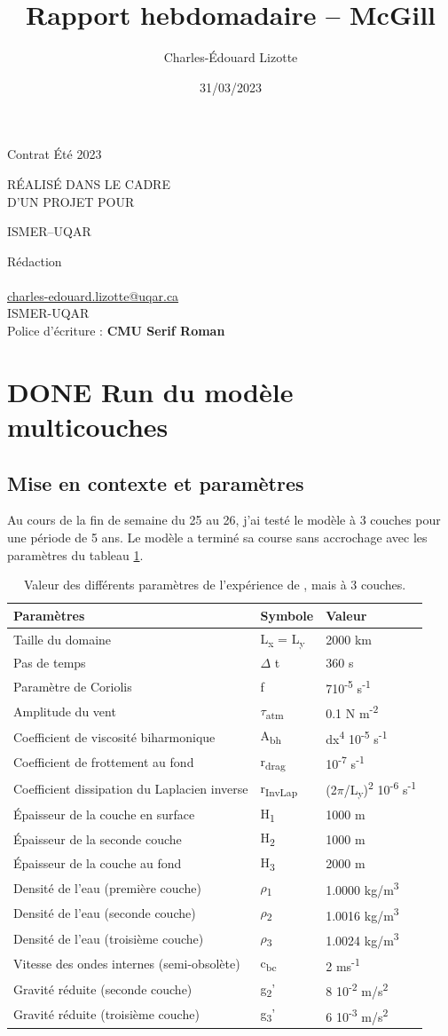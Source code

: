 \documentclass[10pt]{article}
\author{Charles-Édouard Lizotte}
\date{31/03/2023}
\title{Rapport hebdomadaire -- McGill}
\makeatletter
\numberwithin{equation}{section}
\newcommand{\mytitlepage}{
\begin{titlepage}
\begin{center}
{\Huge \thesubtitle \par}
\vspace{2cm}
{\Huge \MakeUppercase{\thetitle} \par}
\vspace{2cm}
RÉALISÉ DANS LE CADRE\\ D'UN PROJET POUR \par
\vspace{2cm}
{\Huge ISMER--UQAR \par}
\vspace{2cm}
{\thedate}
\end{center}
\vfill
Rédaction \\
{\theauthor}\\
\url{charles-edouard.lizotte@uqar.ca}\\
ISMER-UQAR\\
Police d'écriture : \textbf{CMU Serif Roman}
\end{titlepage}
}
\newcommand{\thesubtitle}{Contrat Été 2023}
\makeatother
\begin{document}
\mytitlepage
\tableofcontents\newpage
\section{{\bfseries\sffamily DONE} Run du modèle multicouches}
\label{sec:org4f398c6}
\subsection{Mise en contexte et paramètres}
\label{sec:org3e4dae2}
Au cours de la fin de semaine du 25 au 26, j'ai testé le modèle à 3 couches pour une période de 5 ans.
Le modèle a terminé sa course sans accrochage avec les paramètres du tableau \ref{tab:orgf795e99}.

\begin{table}[htbp]
\caption{\label{tab:orgf795e99}Valeur des différents paramètres de l'expérience de , mais à 3 couches.}
\centering
\begin{tabular}{lll}
\hline
\hline
Paramètres & Symbole & Valeur\\
\hline
Taille du domaine & L\textsubscript{x} = L\textsubscript{y} & 2000 km\\
Pas de temps & \(\Delta\) t & 360 s\\
Paramètre de Coriolis & f & 7\texttimes{}10\textsuperscript{-5} s\textsuperscript{-1}\\
Amplitude du vent & \(\tau\)\textsubscript{atm} & 0.1 N m\textsuperscript{-2}\\
Coefficient de viscosité biharmonique & A\textsubscript{bh} & dx\textsuperscript{4} \texttimes{}10\textsuperscript{-5} s\textsuperscript{-1}\\
Coefficient de frottement au fond & r\textsubscript{drag} & 10\textsuperscript{-7} s\textsuperscript{-1}\\
Coefficient dissipation du Laplacien inverse & r\textsubscript{InvLap} & (2\(\pi\)/L\textsubscript{y})\textsuperscript{2} \texttimes{} 10\textsuperscript{-6} s\textsuperscript{-1}\\
Épaisseur de la couche en surface & H\textsubscript{1} & 1000 m\\
Épaisseur de la seconde couche & H\textsubscript{2} & 1000 m\\
Épaisseur de la couche au fond & H\textsubscript{3} & 2000 m\\
Densité de l'eau (première couche) & \(\rho\)\textsubscript{1} & 1.0000 kg/m\textsuperscript{3}\\
Densité de l'eau (seconde couche) & \(\rho\)\textsubscript{2} & 1.0016 kg/m\textsuperscript{3}\\
Densité de l'eau (troisième couche) & \(\rho\)\textsubscript{3} & 1.0024 kg/m\textsuperscript{3}\\
Vitesse des ondes internes (semi-obsolète) & c\textsubscript{bc} & 2 ms\textsuperscript{-1}\\
Gravité réduite (seconde couche) & g\textsubscript{2}' & 8 \texttimes{} 10\textsuperscript{-2} m/s\textsuperscript{2}\\
Gravité réduite (troisième couche) & g\textsubscript{3}' & 6 \texttimes{} 10\textsuperscript{-3} m/s\textsuperscript{2}\\
\hline
\hline
\end{tabular}
\end{table}
\end{document}
